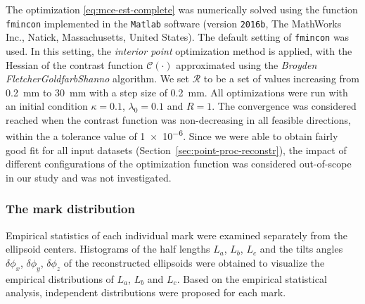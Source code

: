 \documentclass[journal]{IEEEtran}
\begin{document}
The optimization \eqref{eq:mce-est-complete} was numerically solved
using the function \texttt{fmincon} implemented in the \texttt{Matlab}
software (version \texttt{2016b}, The MathWorks Inc., Natick,
Massachusetts, United States). The default setting of \texttt{fmincon}
was used. In this setting, the \textit{interior point} optimization
method is applied, with the Hessian of the contrast function
$\mathcal{C}(\cdot)$ approximated using the \textit{Broyden\textendash
  Fletcher\textendash Goldfarb\textendash Shanno} algorithm. We set
$\mathcal{R}$ to be a set of values increasing from \SI{0.2}{\mm} to
\SI{30}{\mm} with a step size of \SI{0.2}{\mm}. All optimizations were
run with an initial condition $\kappa = 0.1$, $\lambda_0 = 0.1$ and
$R = 1$. The convergence was considered reached when the contrast
function was non-decreasing in all feasible directions, within the a
tolerance value of \num{1e-6}. Since we were able to obtain fairly
good fit for all input datasets
(Section~\ref{sec:point-proc-reconstr}), the impact of different
configurations of the optimization function was considered
out-of-scope in our study and was not investigated.

\subsubsection{The mark distribution}
\label{sec:mark-distribution}

Empirical statistics of each individual mark were examined separately
from the ellipsoid centers. Histograms of the half lengths $L_a$,
$L_b$, $L_c$ and the tilts angles $\delta\phi_x$, $\delta\phi_y$,
$\delta\phi_z$ of the reconstructed ellipsoids were obtained to
visualize the empirical distributions of $L_a$, $L_b$ and $L_c$. Based
on the empirical statistical analysis, independent distributions were
proposed for each mark.

%
%
\end{document}
